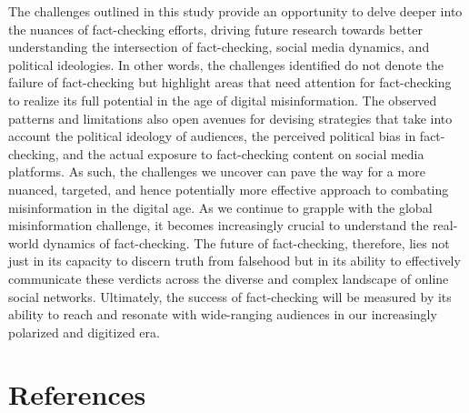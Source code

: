 \documentclass[
  12pt,
]{article}
\begin{document}
The challenges outlined in this study provide an opportunity to delve
deeper into the nuances of fact-checking efforts, driving future
research towards better understanding the intersection of fact-checking,
social media dynamics, and political ideologies. In other words, the
challenges identified do not denote the failure of fact-checking but
highlight areas that need attention for fact-checking to realize its
full potential in the age of digital misinformation. The observed
patterns and limitations also open avenues for devising strategies that
take into account the political ideology of audiences, the perceived
political bias in fact-checking, and the actual exposure to
fact-checking content on social media platforms. As such, the challenges
we uncover can pave the way for a more nuanced, targeted, and hence
potentially more effective approach to combating misinformation in the
digital age. As we continue to grapple with the global misinformation
challenge, it becomes increasingly crucial to understand the real-world
dynamics of fact-checking. The future of fact-checking, therefore, lies
not just in its capacity to discern truth from falsehood but in its
ability to effectively communicate these verdicts across the diverse and
complex landscape of online social networks. Ultimately, the success of
fact-checking will be measured by its ability to reach and resonate with
wide-ranging audiences in our increasingly polarized and digitized era.

\newpage

\hypertarget{references}{%
\section*{References}\label{references}}
\end{document}
